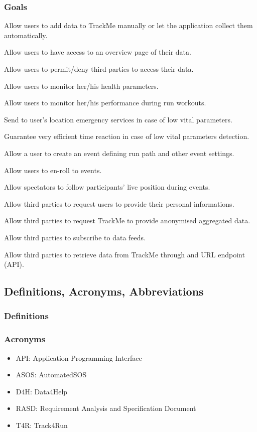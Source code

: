 \documentclass{article}
\begin{document}
\subsubsection{Goals}
\begin{enumerate}[label={\textbf{[G\arabic*]}}]
\item Allow users to add data to TrackMe manually or let the application collect them automatically.
\item Allow users to have access to an overview page of their data.
\item Allow users to permit/deny third parties to access their data.
\item Allow users to monitor her/his health parameters.
\item Allow users to monitor her/his performance during run workouts.
\item Send to user’s location emergency services in case of low vital parameters. 
\item Guarantee very efficient time reaction in case of low vital parameters detection.
\item Allow a user to create an event defining run path and other event settings.
\item Allow users to en-roll to events.
\item Allow spectators to follow participants’ live position during events.


\item Allow third parties to request users to provide their personal informations.
\item Allow third parties to request TrackMe to provide anonymised aggregated data.
\item Allow third parties to subscribe to data feeds.
\item Allow third parties to retrieve data from TrackMe through and URL endpoint (API). 
\end{enumerate}


\subsection{Definitions, Acronyms, Abbreviations}
\subsubsection{Definitions}

\subsubsection{Acronyms}
\begin{itemize}
\item API: Application Programming Interface
\item ASOS: AutomatedSOS
\item D4H: Data4Help
\item RASD:  Requirement Analysis and Specification Document 
\item T4R: Track4Run 
\end{itemize}
\end{document}
